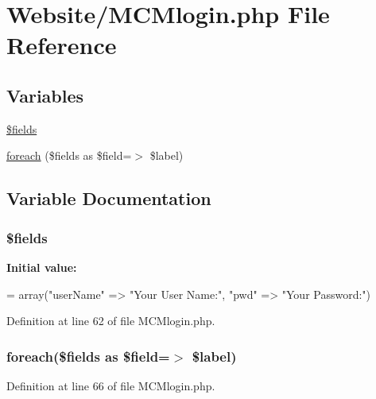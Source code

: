 \hypertarget{_m_c_mlogin_8php}{\section{Website/\-M\-C\-Mlogin.php File Reference}
\label{_m_c_mlogin_8php}
}
\subsection*{Variables}
\begin{DoxyCompactItemize}
\item 
\hyperlink{_m_c_mlogin_8php_ab2303c817e3b402b77b7f99627b9c319}{\$fields}
\item 
\hyperlink{_m_c_mlogin_8php_a58d12ec81e33be9b80508ee874adb2c1}{foreach} (\$fields as \$field=$>$ \$label)
\end{DoxyCompactItemize}


\subsection{Variable Documentation}
\hypertarget{_m_c_mlogin_8php_ab2303c817e3b402b77b7f99627b9c319}{
\subsubsection[{\$fields}]{\setlength{\rightskip}{0pt plus 5cm}\$fields}}\label{_m_c_mlogin_8php_ab2303c817e3b402b77b7f99627b9c319}
{\bfseries Initial value\-:}
\begin{DoxyCode}
= array(\textcolor{stringliteral}{"userName"} => \textcolor{stringliteral}{"Your User Name:"},
                    \textcolor{stringliteral}{"pwd"} => \textcolor{stringliteral}{"Your Password:"})
\end{DoxyCode}


Definition at line 62 of file M\-C\-Mlogin.\-php.

\hypertarget{_m_c_mlogin_8php_a58d12ec81e33be9b80508ee874adb2c1}{
\subsubsection[{foreach}]{\setlength{\rightskip}{0pt plus 5cm}foreach(\$fields as \$field=$>$ \$label)}}\label{_m_c_mlogin_8php_a58d12ec81e33be9b80508ee874adb2c1}


Definition at line 66 of file M\-C\-Mlogin.\-php.


